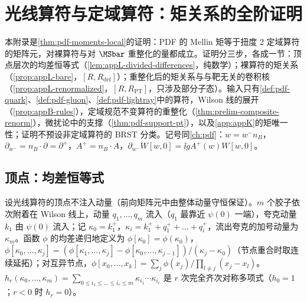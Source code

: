 \chapter{光线算符与定域算符：矩关系的全阶证明}\label{app:appL}

本附录是\cref{thm:pdf-moments-local}的证明：PDF 的 Mellin 矩等于扭度 2 定域算符的矩阵元，对裸算符与对 $\MSbar$ 重整化的量都成立。证明分三步，各成一节：顶点层次的均差恒等式（\cref{lem:appL-divided-differences}，纯数学）；裸算符的矩关系（\cref{prop:appL-bare}，$[R,R_{\mathrm{def}}]$）；重整化后的矩关系与与靶无关的卷积核（\cref{prop:appL-renormalized}，$[R,R_{\mathrm{PT}}]$，只涉及部分子态）。输入只有\cref{def:pdf-quark}、\cref{def:pdf-gluon}、\cref{def:pdf-lightray}中的算符，Wilson 线的展开（\cref{prop:appB-rules}），定域规范不变算符的重整化（\cref{thm:prelim-composite-renorm}），微扰论中的支撑（\cref{thm:pdf-support-pt}），以及\cref{app:appK}的矩唯一性；证明不预设非定域算符的 BRST 分类。记号同\cref{ch:pdf}：$w=w^-n_B$，$\partial_{w^-}=n_B\cdot\partial=\partial^+$，$A^+=n_B\cdot A$，$\partial_{w^-}W[w,0]=\ii gA^+(w)W[w,0]$。

\section{顶点：均差恒等式}\label{sec:appL-vertices}

设光线算符的顶点不注入动量（前向矩阵元中由整体动量守恒保证）。$m$ 个胶子依次附着在 Wilson 线上，动量 $q_1,\dots,q_m$ 流入（$q_1$ 最靠近 $\psi(0)$ 一端），夸克动量 $k_1$ 由 $\psi(0)$ 流入；记 $\kappa_0=k_1^+$，$\kappa_i=k_1^++q_1^++\dots+q_i^+$，流出夸克的加号动量为 $\kappa_m$。函数 $\phi$ 的均差递归地定义为 $\phi[\kappa_0]=\phi(\kappa_0)$，$\phi[\kappa_0,\dots,\kappa_j]=(\phi[\kappa_1,\dots,\kappa_j]-\phi[\kappa_0,\dots,\kappa_{j-1}])/(\kappa_j-\kappa_0)$（节点重合时取连续延拓）；对互异节点，$\phi[x_0,\dots,x_k]=\sum_j\phi(x_j)/\prod_{l\ne j}(x_j-x_l)$。$h_r(\kappa_0,\dots,\kappa_m)=\sum_{0\le i_1\le\dots\le i_r\le m}\kappa_{i_1}\cdots\kappa_{i_r}$ 是 $r$ 次完全齐次对称多项式（$h_0=1$；$r<0$ 时 $h_r=0$）。

